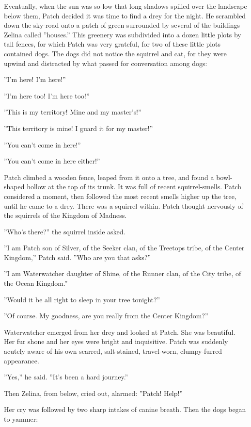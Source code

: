 \documentclass[12pt]{book}
\begin{document}
Eventually, when the sun was so low that long shadows spilled over the
landscape below them, Patch decided it was time to find a drey for the
night. He scrambled down the sky-road onto a patch of green surrounded
by several of the buildings Zelina called ''houses.'' This greenery
was subdivided into a dozen little plots by tall fences, for which
Patch was very grateful, for two of these little plots contained
dogs. The dogs did not notice the squirrel and cat, for they were
upwind and distracted by what passed for conversation among dogs:

''I'm here! I'm here!''

''I'm here too! I'm here too!''

''This is my territory! Mine and my master's!''

''This territory is mine! I guard it for my master!''

''You can't come in here!''

''You can't come in here either!''

Patch climbed a wooden fence, leaped from it onto a tree, and found a
bowl-shaped hollow at the top of its trunk. It was full of recent
squirrel-smells. Patch considered a moment, then followed the most
recent smells higher up the tree, until he came to a drey. There was a
squirrel within. Patch thought nervously of the squirrels of the
Kingdom of Madness.

''Who's there?'' the squirrel inside asked.

''I am Patch son of Silver, of the Seeker clan, of the Treetops tribe,
of the Center Kingdom,'' Patch said. ''Who are you that asks?''

''I am Waterwatcher daughter of Shine, of the Runner clan, of the City
tribe, of the Ocean Kingdom.''

''Would it be all right to sleep in your tree tonight?''

''Of course. My goodness, are you really from the Center Kingdom?''

Waterwatcher emerged from her drey and looked at Patch. She was
beautiful. Her fur shone and her eyes were bright and
inquisitive. Patch was suddenly acutely aware of his own scarred,
salt-stained, travel-worn, clumpy-furred appearance.

''Yes,'' he said. ''It's been a hard journey.''

Then Zelina, from below, cried out, alarmed: ''Patch! Help!''

Her cry was followed by two sharp intakes of canine breath. Then the
dogs began to yammer:
\end{document}
